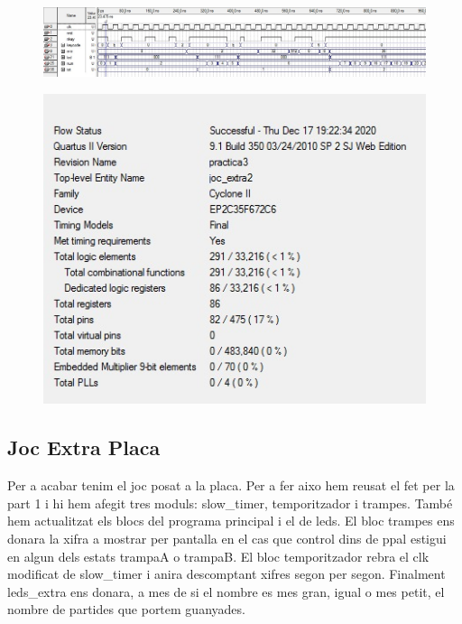 \documentclass[12pt, a4papre]{article}
\begin{document}
	\begin{figure}[H]
	
	\begin{center}
		\includegraphics[width=130mm]{SimulacioJocExtra.jpeg}
		\end{center}
	\end{figure}
	
	
	\begin{figure}[H]
	
	\begin{center}
		\includegraphics[width=130mm]{informeJocExtra.jpeg}
		\end{center}
	\end{figure}
	

\subsection{Joc Extra Placa}
	Per a acabar tenim el joc posat a la placa. Per a fer aixo hem reusat el fet per la part 1 i hi hem afegit tres moduls: slow\_timer, temporitzador i trampes. També hem actualitzat els blocs del programa principal i el de leds. 
El bloc trampes ens donara la xifra a mostrar per pantalla en el cas que control dins de ppal estigui en algun dels estats trampaA o trampaB. 
El bloc temporitzador rebra el clk modificat de slow\_timer i anira descomptant xifres segon per segon. 
Finalment leds\_extra ens donara, a mes de si el nombre es mes gran, igual o mes petit, el nombre de partides que portem guanyades.
\end{document}
